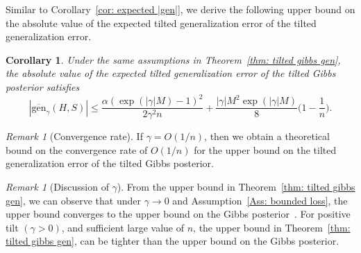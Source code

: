 \documentclass{article}
\theoremstyle{plain}
\theoremstyle{plain}
\newtheorem{corollary}[theorem]{Corollary}
\theoremstyle{definition}
\theoremstyle{remark}
\newtheorem{remark}[theorem]{Remark}
\begin{document}
    Similar to Corollary~\ref{cor: expected |gen|}, we derive the following upper bound on the absolute value of the expected tilted generalization error of the tilted generalization error.
    \begin{corollary}\label{Cor: tilted  Gibbs |gen|}
        Under the same assumptions in Theorem~\ref{thm: tilted gibbs gen}, the absolute value of the expected tilted generalization error of the tilted Gibbs posterior satisfies
        \begin{equation}
       |\overline{\mathrm{gen}}_{\gamma}(H,S)|\leq \frac{\alpha (\exp(|\gamma| M)-1)^2}{2\gamma^2 n} +\frac{|\gamma|M^2 \exp(|\gamma| M)}{8}\Big(1-\frac{1}{n}\Big).
        \end{equation}
    \end{corollary}
\begin{remark}[Convergence rate]
    If $\gamma=O(1/n)$, then we obtain a theoretical bound on the convergence rate of $O(1/n)$ for the upper bound on the tilted generalization error of the tilted Gibbs posterior.
\end{remark}
\begin{remark}[Discussion of $\gamma$]
    From the upper bound in Theorem~\ref{thm: tilted gibbs gen}, we can observe that under $\gamma\rightarrow 0$ and Assumption~\ref{Ass: bounded loss}, the upper bound converges to the upper bound on the Gibbs posterior~\citep{aminian2021exact}. For positive tilt $(\gamma>0)$, and sufficient large value of $n$, the upper bound in Theorem~\ref{thm: tilted gibbs gen}, can be tighter than the upper bound on the Gibbs posterior.
\end{remark}
\end{document}
